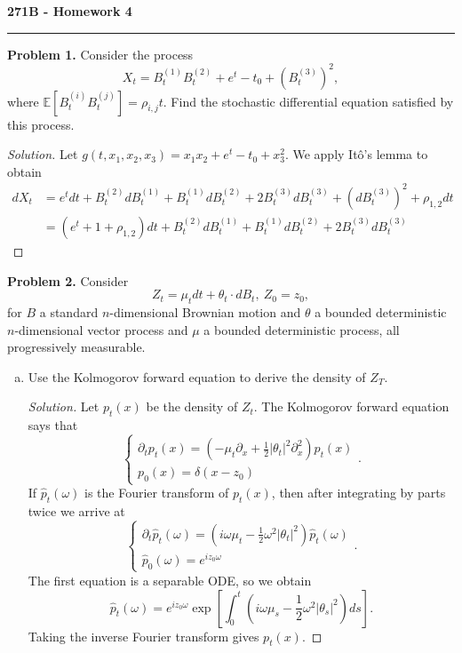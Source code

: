 \documentclass[11pt,letterpaper]{report}
\newcommand{\E}{\mathbb{E}}
\newenvironment{solution}
{\begin{proof}[Solution]}
{\end{proof}}
\begin{document}
\begin{center}
{\bf \Large 271B - Homework 4}
\vspace{0.2cm}
\hrule
\end{center}

\noindent\textbf{Problem 1. }
Consider the process
\[
X_t = B^{(1)}_tB^{(2)}_t + e^{t}-t_0 + (B^{(3)}_t)^2,
\]
where $\E[B^{(i)}_tB^{(j)}_t] = \rho_{i,j}t$. Find the stochastic differential equation satisfied by this process.
\begin{solution}
	Let $g(t, x_1, x_2, x_3) = x_1x_2+e^t-t_0+x_3^2$. We apply It\^o's lemma to obtain
	\begin{align*}
		dX_t &= e^tdt + B^{(2)}_tdB^{(1)}_t + B^{(1)}_tdB^{(2)}_t + 2B^{(3)}_tdB^{(3)}_t + (dB^{(3)}_t)^2 + \rho_{1,2}dt\\
		&= (e^t + 1+\rho_{1,2})dt + B^{(2)}_tdB^{(1)}_t + B^{(1)}_tdB^{(2)}_t + 2B^{(3)}_tdB^{(3)}_t
	\end{align*}
\end{solution}


\noindent\textbf{Problem 2. }
Consider
\[
Z_t = \mu_tdt + \theta_t\cdot dB_t,\ Z_0 = z_0,
\]
for $B$ a standard $n$-dimensional Brownian motion and $\theta$ a bounded deterministic $n$-dimensional vector process and $\mu$ a bounded deterministic process, all progressively measurable.
\begin{enumerate}[(a)]
	\item Use the Kolmogorov forward equation to derive the density of $Z_T$.
	\begin{solution}
		Let $p_t(x)$ be the density of $Z_t$. The Kolmogorov forward equation says that
		\[
		\begin{cases}\partial_tp_t(x) = \left(-\mu_t\partial_x + \frac{1}{2}|\theta_t|^2\partial^2_x\right)p_t(x)\\
		p_0(x) = \delta(x - z_0)
		\end{cases}.
		\]
		If $\widehat{p}_t(\omega)$ is the Fourier transform of $p_t(x)$, then after integrating by parts twice we arrive at
		\[
		\begin{cases}\partial_t\widehat{p}_t(\omega) = \left(i\omega\mu_t -\frac{1}{2}\omega^2|\theta_t|^2\right)\widehat{p}_t(\omega)\\
		\widehat{p}_0(\omega) = e^{iz_0\omega}
		\end{cases}.
		\]
		The first equation is a separable ODE, so we obtain
		\[
		\widehat{p}_t(\omega) = e^{iz_0\omega}\exp\left[\int_0^t\left(i\omega\mu_s - \frac{1}{2}\omega^2|\theta_s|^2 \right)ds \right].
		\]
		Taking the inverse Fourier transform gives $p_t(x)$.
	\end{solution}
\end{enumerate}
\end{document}
